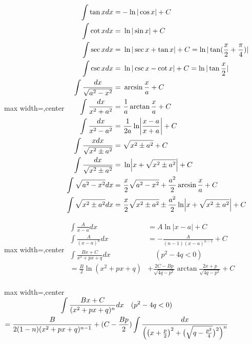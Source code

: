 \documentclass[twocolumn,10pt]{ctexart}
\begin{document}
\begin{adjustbox}{max width=\linewidth,center}
$\begin{aligned}
\int\tan xdx=&-\ln|\cos x|+C\\
\int\cot xdx=&\ \ln|\sin x|+C\\
\int\sec xdx=&\ \ln|\sec x+\tan x|+C=\ln|\tan(\frac x2+\frac\pi4)|\\
\int\csc xdx=&\ \ln|\csc x-\cot x|+C=\ln|\tan\frac x2|\\
\int\frac{dx}{\sqrt{a^2-x^2}}=&\ \arcsin\frac{x}{a}+C\\
\int\frac{dx}{x^2+a^2}=&\ \frac{1}{a}\arctan\frac{x}{a}+C\\
\int\frac{dx}{x^2-a^2}=&\ \frac{1}{2a}\ln\biggl|\frac{x-a}{x+a}\biggr|+C\\
\int\frac{xdx}{\sqrt{x^2\pm a^2}}=&\ \sqrt{x^2\pm a^2}+C\\
\int\frac{dx}{\sqrt{x^2\pm a^2}}=&\ \ln \Bigl|x+\sqrt{x^2\pm a^2}\Bigr|+C\\
\int\sqrt{a^2-x^2}dx=&\ \frac{x}{2}\sqrt{a^2-x^2}+\frac{a^2}{2}\arcsin\frac{x}{a}+C\\
\int\sqrt{x^2\pm a^2}dx=&\ \frac{x}{2}\sqrt{x^2\pm a^2}\pm\frac{a^2}{2}\ln\Bigl|x+\sqrt{x^2\pm a^2}\Bigr|+C
\end{aligned}$
\end{adjustbox}

\begin{adjustbox}{max width=\linewidth,center}
$\begin{aligned}
\int\frac A{x-a}dx&=A\ln|x-a|+C\\
\int\frac A{(x-a)^n}dx&=-\frac A{(n-1)(x-a)^{n-1}}+C\\
\int\frac{Bx+C}{x^2+px+q}dx&\quad(p^2-4q<0)\\
=\frac B2\ln(x^2+px+q)&+\frac{2C-Bp}{\sqrt{4q-p^2}}\arctan\frac{2x+p}{\sqrt{4q-p^2}}+C\\
\end{aligned}$
\end{adjustbox}

\begin{adjustbox}{max width=\linewidth,center}
$\begin{gathered}
\int\frac{Bx+C}{(x^2+px+q)^n}dx\quad(p^2-4q<0)\\
=\frac B{2(1-n)(x^2+px+q)^{n-1}}
+(C-\frac{Bp}2)\int\frac{dx}{\Bigl(\bigl(x+\frac p2\bigr)^2+\bigl(\sqrt{q-\frac{p^2}4}\bigr)^2\Bigr)^n}
\end{gathered}$
\end{adjustbox}
\end{document}
